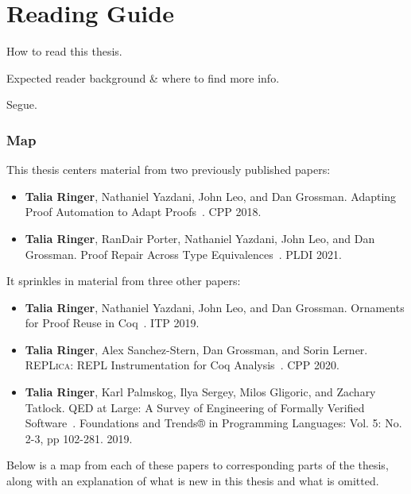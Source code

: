 \section{Reading Guide}


How to read this thesis.

Expected reader background \& where to find more info.

Segue.

\subsubsection*{Map}

This thesis centers material from two previously published papers:

\begin{itemize}
\item \textbf{Talia Ringer}, Nathaniel Yazdani, John Leo, and Dan Grossman. Adapting Proof Automation to Adapt Proofs~\cite{ringer2018adapting}. CPP 2018.
\item \textbf{Talia Ringer}, RanDair Porter, Nathaniel Yazdani, John Leo, and Dan Grossman. Proof Repair Across Type Equivalences~\cite{Ringer2021}. PLDI 2021.
\end{itemize}
It sprinkles in material from three other papers:

\begin{itemize}
\item \textbf{Talia Ringer}, Nathaniel Yazdani, John Leo, and Dan Grossman. Ornaments for Proof Reuse in Coq~\cite{Ringer2019}. ITP 2019.
\item \textbf{Talia Ringer}, Alex Sanchez-Stern, Dan Grossman, and Sorin Lerner. \textsc{REPLica}: REPL Instrumentation for Coq Analysis~\cite{replica}. CPP 2020.
\item \textbf{Talia Ringer}, Karl Palmskog, Ilya Sergey, Milos Gligoric, and Zachary Tatlock. QED at Large: A Survey of Engineering of Formally Verified Software~\cite{PGL-045}. Foundations and Trends® in Programming Languages: Vol. 5: No. 2-3, pp 102-281. 2019. 
\end{itemize}
Below is a map from each of these papers to corresponding parts of the thesis,
along with an explanation of what is new in this thesis and what is omitted.

